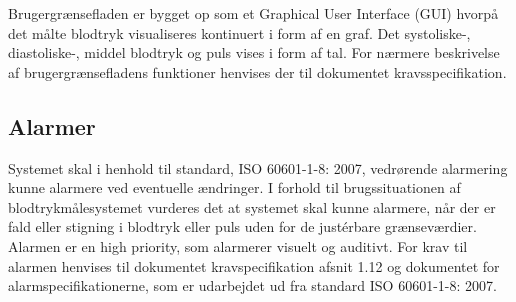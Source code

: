 Brugergrænsefladen er bygget op som et Graphical User Interface (GUI) hvorpå det målte blodtryk visualiseres kontinuert i form af en graf. Det systoliske-, diastoliske-, middel blodtryk
og puls vises i form af tal. For nærmere beskrivelse af brugergrænsefladens funktioner henvises der til dokumentet kravsspecifikation. \clearpage

\subsection{Alarmer}
Systemet skal i henhold til standard, ISO 60601-1-8: 2007, vedrørende alarmering kunne alarmere ved
eventuelle ændringer. I forhold til brugssituationen af blodtrykmålesystemet vurderes
det at systemet skal kunne alarmere, når der er fald eller stigning i blodtryk eller puls uden for de justérbare grænseværdier.
Alarmen er en high priority, som alarmerer visuelt og auditivt. For krav til alarmen henvises til dokumentet kravspecifikation afsnit 1.12 og dokumentet for alarmspecifikationerne, som er udarbejdet ud fra standard ISO 60601-1-8: 2007.



\clearpage 